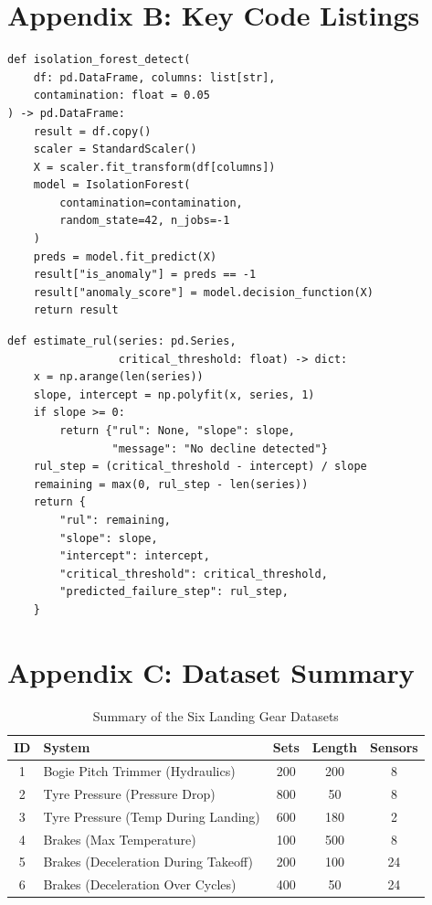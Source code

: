 \documentclass{CLS_zhou430}
\begin{document}
\section{Appendix B: Key Code Listings}

\begin{lstlisting}[caption={Isolation Forest Anomaly Detection}, label={lst:iforest}]
def isolation_forest_detect(
    df: pd.DataFrame, columns: list[str],
    contamination: float = 0.05
) -> pd.DataFrame:
    result = df.copy()
    scaler = StandardScaler()
    X = scaler.fit_transform(df[columns])
    model = IsolationForest(
        contamination=contamination,
        random_state=42, n_jobs=-1
    )
    preds = model.fit_predict(X)
    result["is_anomaly"] = preds == -1
    result["anomaly_score"] = model.decision_function(X)
    return result
\end{lstlisting}

\begin{lstlisting}[caption={RUL Estimation via Linear Extrapolation}, label={lst:rul}]
def estimate_rul(series: pd.Series,
                 critical_threshold: float) -> dict:
    x = np.arange(len(series))
    slope, intercept = np.polyfit(x, series, 1)
    if slope >= 0:
        return {"rul": None, "slope": slope,
                "message": "No decline detected"}
    rul_step = (critical_threshold - intercept) / slope
    remaining = max(0, rul_step - len(series))
    return {
        "rul": remaining,
        "slope": slope,
        "intercept": intercept,
        "critical_threshold": critical_threshold,
        "predicted_failure_step": rul_step,
    }
\end{lstlisting}

\section{Appendix C: Dataset Summary}
\begin{table}[h]
    \centering
    \caption{Summary of the Six Landing Gear Datasets}
    \begin{tabular}{|c|l|c|c|c|}
        \hline \hline
        ID & System & Sets & Length & Sensors \\ \hline
        1 & Bogie Pitch Trimmer (Hydraulics) & 200 & 200 & 8 \\ \hline
        2 & Tyre Pressure (Pressure Drop) & 800 & 50 & 8 \\ \hline
        3 & Tyre Pressure (Temp During Landing) & 600 & 180 & 2 \\ \hline
        4 & Brakes (Max Temperature) & 100 & 500 & 8 \\ \hline
        5 & Brakes (Deceleration During Takeoff) & 200 & 100 & 24 \\ \hline
        6 & Brakes (Deceleration Over Cycles) & 400 & 50 & 24 \\ \hline
        \hline
    \end{tabular}
    \label{tab:datasets}
\end{table}
\end{document}

